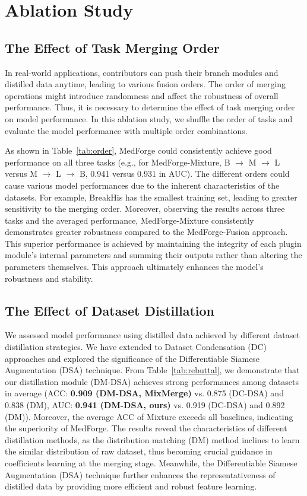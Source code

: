 \section{Ablation Study}
\subsection{The Effect of Task Merging Order}
In real-world applications, contributors can push their branch modules and distilled data anytime, leading to various fusion orders. The order of merging operations might introduce randomness and affect the robustness of overall performance. Thus, it is necessary to determine the effect of task merging order on model performance. In this ablation study, we shuffle the order of tasks and evaluate the model performance with multiple order combinations.

As shown in Table~\ref{tab:order}, MedForge could consistently achieve good performance on all three tasks (e.g., for MedForge-Mixture, B $\rightarrow$ M $\rightarrow$ L versus M $\rightarrow$ L $\rightarrow$ B, 0.941 versus 0.931 in AUC). The different orders could cause various model performances due to the inherent characteristics of the datasets. For example, BreakHis has the smallest training set, leading to greater sensitivity to the merging order. Moreover, observing the results across three tasks and the averaged performance, MedForge-Mixture consistently demonstrates greater robustness compared to the MedForge-Fusion approach. This superior performance is achieved by maintaining the integrity of each plugin module’s internal parameters and summing their outputs rather than altering the parameters themselves. This approach ultimately enhances the model's robustness and stability.


\subsection{The Effect of Dataset Distillation} We assessed model performance using distilled data achieved by different dataset distillation strategies. We have extended to Dataset Condensation (DC) approaches and explored the significance of the Differentiable Siamese Augmentation (DSA) technique. From Table~\ref{tab:rebuttal}, we demonstrate that our distillation module (DM-DSA) achieves strong performances among datasets in average (ACC: \textbf{0.909 (DM-DSA, MixMerge)} vs. 0.875 (DC-DSA) and 0.838 (DM), AUC: \textbf{0.941 (DM-DSA, ours)} vs. 0.919 (DC-DSA) and 0.892 (DM)). Moreover, the average ACC of Mixture exceeds all baselines, indicating the superiority of MedForge. The results reveal the characteristics of different distillation methods, as the distribution matching (DM) method inclines to learn the similar distribution of raw dataset, thus becoming crucial guidance in coefficients learning at the merging stage. Meanwhile, the Differentiable Siamese Augmentation (DSA) technique further enhances the representativeness of distilled data by providing more efficient and robust feature learning.

